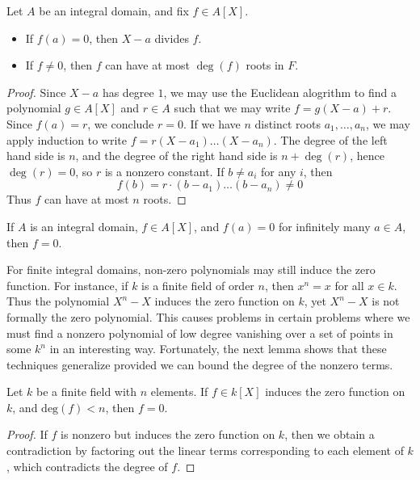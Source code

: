 \begin{theorem}
    Let $A$ be an integral domain, and fix $f \in A[X]$.
    \begin{itemize}
        \item If $f(a) = 0$, then $X - a$ divides $f$.
        \item If $f \neq 0$, then $f$ can have at most $\deg(f)$ roots in $F$.
    \end{itemize}
\end{theorem}
\begin{proof}
    Since $X - a$ has degree $1$, we may use the Euclidean alogrithm to find a polynomial $g \in A[X]$ and $r \in A$ such that we may write $f = g (X - a) + r$. Since $f(a) = r$, we conclude $r = 0$. If we have $n$ distinct roots $a_1, \dots, a_n$, we may apply induction to write $f = r(X - a_1) \dots (X - a_n)$. The degree of the left hand side is $n$, and the degree of the right hand side is $n + \deg(r)$, hence $\deg(r) = 0$, so $r$ is a nonzero constant. If $b \neq a_i$ for any $i$, then
    \[ f(b) = r \cdot (b - a_1) \dots (b - a_n) \neq 0 \]
    Thus $f$ can have at most $n$ roots.
\end{proof}

\begin{corollary}
    If $A$ is an integral domain, $f \in A[X]$, and $f(a) = 0$ for infinitely many $a \in A$, then $f = 0$.
\end{corollary}

For finite integral domains, non-zero polynomials may still induce the zero function. For instance, if $k$ is a finite field of order $n$, then $x^n = x$ for all $x \in k$. Thus the polynomial $X^n - X$ induces the zero function on $k$, yet $X^n - X$ is not formally the zero polynomial. This causes problems in certain problems where we must find a nonzero polynomial of low degree vanishing over a set of points in some $k^n$ in an interesting way. Fortunately, the next lemma shows that these techniques generalize provided we can bound the degree of the nonzero terms.

\begin{lemma}
    Let $k$ be a finite field with $n$ elements. If $f \in k[X]$ induces the zero function on $k$, and $\text{deg}(f) < n$, then $f = 0$.
\end{lemma}
\begin{proof}
    If $f$ is nonzero but induces the zero function on $k$, then we obtain a contradiction by factoring out the linear terms corresponding to each element of $k$, which contradicts the degree of $f$.
\end{proof}

